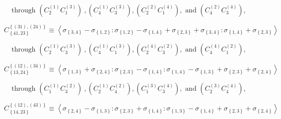 \documentclass[11pt]{article}
\begin{document}
\begin{equation*}
\text{through }\left( C_{2}^{\left( 1\right) }C_{1}^{\left( 3\right)
}\right) \ ,\left( C_{4}^{\left( 1\right) }C_{3}^{\left( 3\right) }\right)
,\left( C_{2}^{\left( 2\right) }C_{1}^{\left( 4\right) }\right) ,\text{ and }%
\left( C_{4}^{\left( 2\right) }C_{3}^{\left( 4\right) }\right) ,
\end{equation*}

\begin{equation*}
C_{\left\{ 41,23\right\} }^{\left\{ \left( 31\right) ,\left( 24\right)
\right\} }\equiv \left\langle \sigma _{\left\{ 3,4\right\} }-\sigma
_{\left\{ 1,2\right\} }:\sigma _{\left\{ 1,2\right\} }-\sigma _{\left\{
1,4\right\} }+\sigma _{\left\{ 2,3\right\} }+\sigma _{\left\{ 3,4\right\}
}:\sigma _{\left\{ 1,4\right\} }+\sigma _{\left\{ 2,3\right\} }\right\rangle 
\end{equation*}

\begin{equation*}
\text{through }\left( C_{2}^{\left( 1\right) }C_{3}^{\left( 3\right)
}\right) \ ,\left( C_{4}^{\left( 1\right) }C_{1}^{\left( 3\right) }\right)
,\left( C_{2}^{\left( 4\right) }C_{3}^{\left( 2\right) }\right) ,\text{ and }%
\left( C_{4}^{\left( 4\right) }C_{1}^{\left( 2\right) }\right) ,
\end{equation*}

\begin{equation*}
C_{\left\{ 13,24\right\} }^{\left\{ \left( 12\right) ,\left( 34\right)
\right\} }\equiv \left\langle \sigma _{\left\{ 1,3\right\} }+\sigma
_{\left\{ 2,4\right\} }:\sigma _{\left\{ 2,3\right\} }-\sigma _{\left\{
1,4\right\} }:\sigma _{\left\{ 1,4\right\} }-\sigma _{\left\{ 1,3\right\}
}+\sigma _{\left\{ 2,3\right\} }+\sigma _{\left\{ 2,4\right\} }\right\rangle 
\end{equation*}

\begin{equation*}
\text{through }\left( C_{1}^{\left( 1\right) }C_{3}^{\left( 2\right)
}\right) \ ,\left( C_{2}^{\left( 1\right) }C_{4}^{\left( 2\right) }\right)
,\left( C_{1}^{\left( 3\right) }C_{3}^{\left( 4\right) }\right) ,\text{ and }%
\left( C_{2}^{\left( 3\right) }C_{4}^{\left( 4\right) }\right) ,
\end{equation*}

\begin{equation*}
C_{\left\{ 14,23\right\} }^{\left\{ \left( 12\right) ,\left( 43\right)
\right\} }\equiv \left\langle \sigma _{\left\{ 2,4\right\} }-\sigma
_{\left\{ 1,3\right\} }:\sigma _{\left\{ 2,3\right\} }+\sigma _{\left\{
1,4\right\} }:\sigma _{\left\{ 1,3\right\} }-\sigma _{\left\{ 1,4\right\}
}+\sigma _{\left\{ 2,3\right\} }+\sigma _{\left\{ 2,4\right\} }\right\rangle 
\end{equation*}
\end{document}
